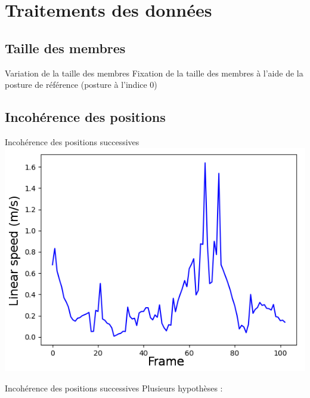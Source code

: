\documentclass[svgnames]{beamer}
\begin{document}
	\section{Traitements des données}
	\subsection{Taille des membres}
	\begin{frame}{Variation de la taille des membres}
		Fixation de la taille des membres à l'aide de la posture de référence (posture à l'indice 0)
	\end{frame}
	
	\subsection{Incohérence des positions}
	\begin{frame}{Incohérence des positions successives}
	\centering
		\includegraphics[scale=0.7]{img/linear_speed_artifacts.png}
	\end{frame}
	
	\begin{frame}{Incohérence des positions successives}
	Plusieurs hypothèses :
		\begin{center}
				\begin{table}[h!]
				\end{table}
		\end{center}
	\end{frame}
	
\end{document}
